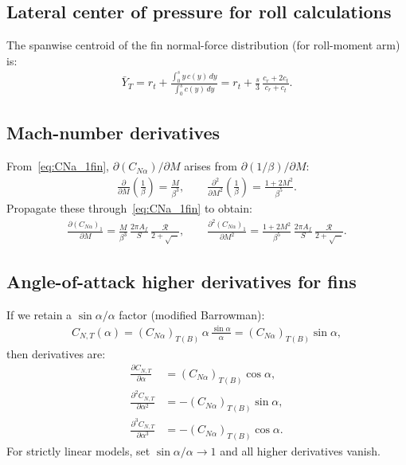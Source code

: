 \documentclass[11pt]{article}
\begin{document}
\subsection{Lateral center of pressure for roll calculations}
The spanwise centroid of the fin normal-force distribution (for roll-moment arm) is:
\begin{align}
\bar Y_T = r_t + \frac{\displaystyle\int_0^s y\,c(y)\,dy}{\displaystyle\int_0^s c(y)\,dy}
= r_t + \frac{s}{3}\,\frac{c_r+2c_t}{c_r+c_t}.
\end{align}

\subsection{Mach-number derivatives}
From~\eqref{eq:CNa_1fin}, $\partial(C_{N\alpha})/\partial M$ arises from $\partial(1/\beta)/\partial M$:
\begin{align}
\frac{\partial}{\partial M}\left(\frac{1}{\beta}\right) = \frac{M}{\beta^3},\qquad
\frac{\partial^2}{\partial M^2}\left(\frac{1}{\beta}\right) = \frac{1+2M^2}{\beta^5}.
\end{align}
Propagate these through~\eqref{eq:CNa_1fin} to obtain:
\begin{align}
\frac{\partial (C_{N\alpha})_1}{\partial M} = \frac{M}{\beta^3}\,\frac{2\pi A_f}{S}\,\frac{\mathcal{R}}{2+\sqrt{\cdots}},\qquad
\frac{\partial^2 (C_{N\alpha})_1}{\partial M^2} = \frac{1+2M^2}{\beta^5}\,\frac{2\pi A_f}{S}\,\frac{\mathcal{R}}{2+\sqrt{\cdots}}.
\end{align}

\subsection{Angle-of-attack higher derivatives for fins}
If we retain a $\sin\alpha/\alpha$ factor (modified Barrowman):
\begin{align}
C_{N,T}(\alpha) = (C_{N\alpha})_{T(B)}\,\alpha\,\frac{\sin\alpha}{\alpha} = (C_{N\alpha})_{T(B)}\sin\alpha,
\end{align}
then derivatives are:
\begin{align}
\frac{\partial C_{N,T}}{\partial\alpha} &= (C_{N\alpha})_{T(B)}\cos\alpha,\\
\frac{\partial^2 C_{N,T}}{\partial\alpha^2} &= -(C_{N\alpha})_{T(B)}\sin\alpha,\\
\frac{\partial^3 C_{N,T}}{\partial\alpha^3} &= -(C_{N\alpha})_{T(B)}\cos\alpha.
\end{align}
For strictly linear models, set $\sin\alpha/\alpha\to 1$ and all higher derivatives vanish.
\end{document}
